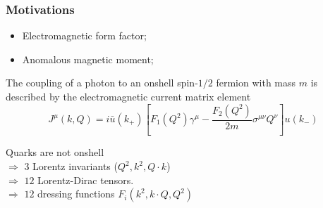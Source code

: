  \begin{frame}\frametitle{Motivations}



\begin{itemize}
	\item Electromagnetic form factor;
	\item Anomalous magnetic moment;
\end{itemize}
\vspace{2mm}

The coupling of a photon to an onshell spin-$1/2$ fermion with mass $m$ is described by the electromagnetic
current matrix element
\begin{equation}
	J^\mu(k, Q)=i\bar{u}(k_+)\left[F_1(Q^2)\gamma^\mu-\frac{F_2(Q^2)}{2m}\sigma^{\mu\nu}Q^\nu\right]u(k_-)
\end{equation}

Quarks are not onshell \\
\hspace{2cm}$\Rightarrow$ $3$ Lorentz invariants ($Q^2, k^2, Q\cdot k$)\\
\vspace{2mm}
\hspace{2cm}$\Rightarrow$ $12$ Lorentz-Dirac tensors.\\
\vspace{2mm}
\hspace{2cm}$\Rightarrow$ $12$ dressing functions $F_i(k^2, k\cdot Q, Q^2)$

\end{frame}

\endinput
